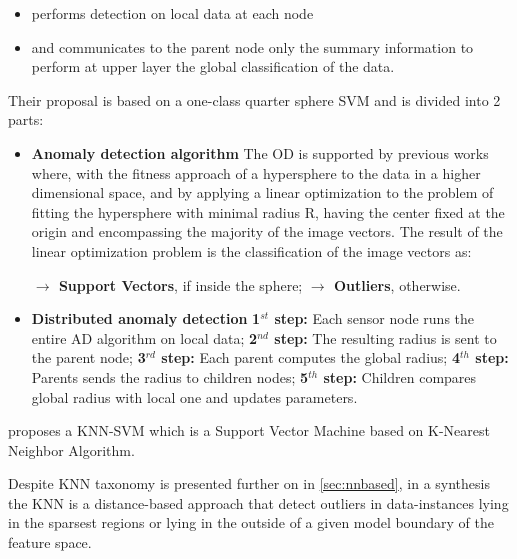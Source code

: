 \begin{itemize}
	\setlength\itemsep{-0.5em}
	\item performs detection on local data at each node
	\item and communicates to the parent node only the summary information to perform at upper layer the global classification of the data.	
\end{itemize}

Their proposal is based on a one-class quarter sphere SVM and is divided into 2 parts:

\begin{itemize}
	\setlength\itemsep{-0.5em}
	\item \textbf{Anomaly detection  algorithm}
	\subitem The OD is supported by previous works where, with the fitness approach of a hypersphere to the data in a higher dimensional space, and by applying a linear optimization to the problem of fitting the hypersphere with minimal radius R, having the center fixed at the origin and encompassing the majority of the image vectors.
	\subitem The result of the linear optimization problem is the classification of the image vectors as:
	
	\vspace{-1em}
	
	\subitem  \textbf{$\rightarrow$ Support Vectors}, if inside the sphere;
	\subitem  \textbf{$\rightarrow$ Outliers}, otherwise.
	\vspace{1em}
	
	\item \textbf{Distributed anomaly detection}
	\subitem \textbf{1$^{st}$ step:} Each sensor node runs the entire AD algorithm on local data;
	\subitem \textbf{2$^{nd}$ step:} The resulting radius is sent to the parent node;
	\subitem \textbf{3$^{rd}$ step:} Each parent computes the global radius;
	\subitem \textbf{4$^{th}$ step:} Parents sends the radius to children nodes;
	\subitem \textbf{5$^{th}$ step:} Children compares global radius with local one and updates parameters.
	
\end{itemize}


\cite{class:xu:2012} proposes a KNN-SVM which is a Support Vector Machine based on K-Nearest Neighbor Algorithm.

Despite KNN taxonomy is presented further on in \ref{sec:nnbased}, in a synthesis  the KNN is a distance-based approach that detect outliers in data-instances lying in the sparsest regions or lying in the outside of a given model boundary of the feature space.

